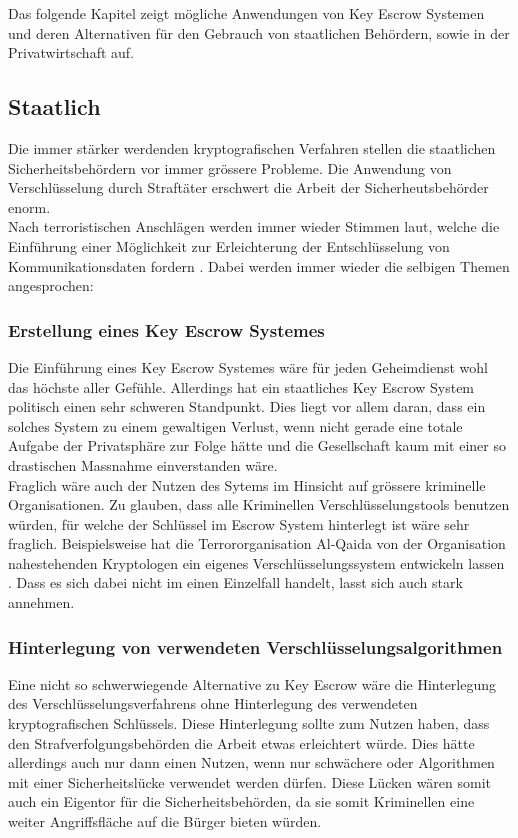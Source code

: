 Das folgende Kapitel zeigt mögliche Anwendungen von Key Escrow Systemen und deren Alternativen für den Gebrauch von staatlichen Behördern, sowie in der Privatwirtschaft auf.
	
	\subsection{Staatlich}
Die immer stärker werdenden kryptografischen Verfahren stellen die staatlichen Sicherheitsbehördern vor immer grössere Probleme. Die Anwendung von Verschlüsselung durch Straftäter erschwert die Arbeit der Sicherheutsbehörder enorm. \\
Nach terroristischen Anschlägen werden immer wieder Stimmen laut, welche die Einführung einer Möglichkeit zur Erleichterung der Entschlüsselung von Kommunikationsdaten fordern \cite{insideit} \cite{annabiselli} \cite{denning}. 
Dabei werden immer wieder die selbigen Themen angesprochen:

	\subsubsection{Erstellung eines Key Escrow Systemes}
Die Einführung eines Key Escrow Systemes wäre für jeden Geheimdienst wohl das höchste aller Gefühle. Allerdings hat ein staatliches Key Escrow System politisch einen sehr schweren Standpunkt. Dies liegt vor allem daran, dass ein solches System zu einem gewaltigen Verlust, wenn nicht gerade eine totale Aufgabe der Privatsphäre zur Folge hätte und die Gesellschaft kaum mit einer so drastischen Massnahme einverstanden wäre.\cite {insideit} \\
Fraglich wäre auch der Nutzen des Sytems im Hinsicht auf grössere kriminelle Organisationen. Zu glauben, dass alle Kriminellen Verschlüsselungstools benutzen würden, für welche der Schlüssel im Escrow System hinterlegt ist wäre sehr fraglich. Beispielsweise hat die Terrororganisation Al-Qaida von der Organisation nahestehenden Kryptologen ein eigenes Verschlüsselungssystem entwickeln lassen \cite{denning}. Dass es sich dabei nicht im einen Einzelfall handelt, lasst sich auch stark annehmen.
	
	\subsubsection{Hinterlegung von verwendeten Verschlüsselungsalgorithmen}
Eine nicht so schwerwiegende Alternative zu Key Escrow wäre die Hinterlegung des Verschlüsselungsverfahrens ohne Hinterlegung des verwendeten kryptografischen Schlüssels. Diese Hinterlegung sollte zum Nutzen haben, dass den Strafverfolgungsbehörden die Arbeit etwas erleichtert würde. Dies hätte allerdings auch nur dann einen Nutzen, wenn nur schwächere oder Algorithmen mit einer Sicherheitslücke verwendet werden dürfen. Diese Lücken wären somit auch ein Eigentor für die Sicherheitsbehörden, da sie somit Kriminellen eine weiter Angriffsfläche auf die Bürger bieten würden. \cite{adminch} %

